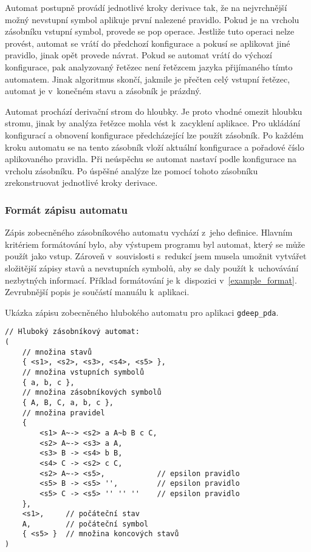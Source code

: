 Automat postupně provádí jednotlivé kroky derivace tak, že na nejvrchnější možný nevstupní symbol aplikuje první nalezené pravidlo. Pokud je na vrcholu zásobníku vstupní symbol, provede se pop operace. Jestliže tuto operaci nelze provést, automat se vrátí do předchozí konfigurace a pokusí se aplikovat jiné pravidlo, jinak opět provede návrat. Pokud se automat vrátí do výchozí konfigurace, pak analyzovaný řetězec není řetězcem jazyka přijímaného tímto automatem. Jinak algoritmus skončí, jakmile je přečten celý vstupní řetězec, automat je v~konečném stavu a zásobník je prázdný.

Automat prochází derivační strom do hloubky. Je proto vhodné omezit hloubku stromu, jinak by analýza řetězce mohla vést k~zacyklení aplikace. Pro ukládání konfigurací a obnovení konfigurace předcházející lze použít zásobník. Po každém kroku automatu se na tento zásobník vloží aktuální konfigurace a pořadové číslo aplikovaného pravidla. Při neúspěchu se automat nastaví podle konfigurace na vrcholu zásobníku. Po úspěšné analýze lze pomocí tohoto zásobníku zrekonstruovat jednotlivé kroky derivace.

\subsubsection{Formát zápisu automatu}\label{kap_aplikace_format}

Zápis zobecněného zásobníkového automatu vychází z~jeho definice. Hlavním kritériem formátování bylo, aby výstupem programu byl automat, který se může použít jako vstup. Zároveň v~souvislosti s~redukcí jsem musela umožnit vytvářet složitější zápisy stavů a nevstupních symbolů, aby se daly použít k~uchovávání nezbytných informací. Příklad formátování je k~dispozici v~\ref{example_format}. Zevrubnější popis je součástí manuálu k~aplikaci.

\begin{Example} \label{example_format}
Ukázka zápisu zobecněného hlubokého automatu pro aplikaci \texttt{gdeep\_pda}.

\begin{verbatim}
// Hluboký zásobníkový automat:
(
    // množina stavů
    { <s1>, <s2>, <s3>, <s4>, <s5> },
    // množina vstupních symbolů
    { a, b, c },
    // množina zásobníkových symbolů
    { A, B, C, a, b, c },
    // množina pravidel
    { 
        <s1> A~-> <s2> a A~b B c C,
        <s2> A~-> <s3> a A,
        <s3> B -> <s4> b B,
        <s4> C -> <s2> c C,
        <s2> A~-> <s5>,            // epsilon pravidlo
        <s5> B -> <s5> '',         // epsilon pravidlo
        <s5> C -> <s5> '' '' ''    // epsilon pravidlo
    },
    <s1>,     // počáteční stav
    A,        // počáteční symbol
    { <s5> }  // množina koncových stavů	
)
\end{verbatim}
\end{Example}

